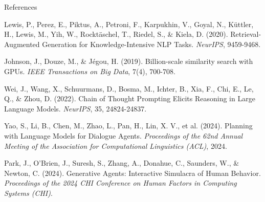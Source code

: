 \documentclass{beamer}
\begin{document}
\begin{frame}{References}
    \scriptsize %
    \begin{thebibliography}{9}
    
        Lewis, P., Perez, E., Piktus, A., Petroni, F., Karpukhin, V., Goyal, N., Küttler, H., Lewis, M., Yih, W., Rocktäschel, T., Riedel, S., \& Kiela, D. (2020).  
        \newblock Retrieval-Augmented Generation for Knowledge-Intensive NLP Tasks.  
        \newblock \textit{NeurIPS}, 9459-9468.  

        Johnson, J., Douze, M., \& Jégou, H. (2019).  
        \newblock Billion-scale similarity search with GPUs.  
        \newblock \textit{IEEE Transactions on Big Data}, 7(4), 700-708.  

        Wei, J., Wang, X., Schuurmans, D., Bosma, M., Ichter, B., Xia, F., Chi, E., Le, Q., \& Zhou, D. (2022).  
        \newblock Chain of Thought Prompting Elicits Reasoning in Large Language Models.  
        \newblock \textit{NeurIPS}, 35, 24824-24837.  

        Yao, S., Li, B., Chen, M., Zhao, L., Pan, H., Lin, X. V., et al. (2024).  
        \newblock Planning with Language Models for Dialogue Agents.  
        \newblock \textit{Proceedings of the 62nd Annual Meeting of the Association for Computational Linguistics (ACL)}, 2024.  

        Park, J., O'Brien, J., Suresh, S., Zhang, A., Donahue, C., Saunders, W., \& Newton, C. (2024).  
        \newblock Generative Agents: Interactive Simulacra of Human Behavior.  
        \newblock \textit{Proceedings of the 2024 CHI Conference on Human Factors in Computing Systems (CHI)}.  

    \end{thebibliography}
\end{frame}
\end{document}

